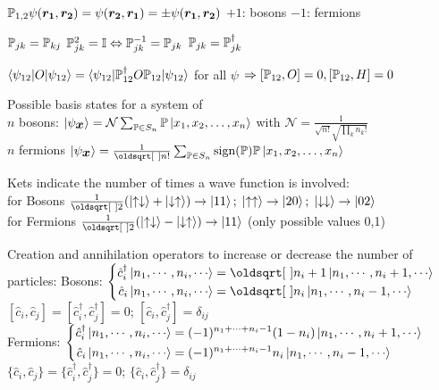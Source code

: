\begin{squishlist}
    \item $\P_{1,2} \psi(\vec{r_1}, \vec{r_2}) = \psi(\vec{r_2}, \vec{r_1}) = \pm \psi(\vec{r_1}, \vec{r_2})$ \quad $+1$: bosons \quad $-1$: fermions
    \item $\P_{jk} = \P_{kj}$ \squishsep $\P_{jk}^2 = \id \Leftrightarrow \P_{jk}^{-1}=\P_{jk}$ \squishsep $\P_{jk} = \P_{jk}^{\dagger}$
    \item $\braket{\psi_{12}|O|\psi_{12}} = \braket{\psi_{12}|\P_{12}^{\dagger}O\P_{12}|\psi_{12}}$ for all $\psi$ $\Rightarrow [\P_{12},O] = 0, [\P_{12},H] = 0$
    \item Possible basis states for a system of \\ $n$ bosons: $\ket{\psi_{\vec{x}}} = \mathcal{N} \sum_{\P \in S_n} \P\ket{x_1,x_2, \ldots, x_n}$ with $\mathcal{N} = \frac{1}{\sqrt{n!}\sqrt{\prod_k n_k !}}$ \\
    $n$ fermions $\ket{\psi_{\vec{x}}} = \frac{1}{\sqrt{n!}} \sum_{\P \in S_n} \text{sign}(\P) \P \ket{x_1, x_2, \ldots, x_n}$
\end{squishlist}

\begin{squishlist}
    \item Kets indicate the number of times a wave function is involved:\\
    for Bosons $\frac{1}{\sqrt{2}} ( \ket{\uparrow \downarrow} + \ket{\downarrow \uparrow}) \rightarrow \ket{11};\; \ket{\uparrow \uparrow} \rightarrow \ket{20};\; \ket{\downarrow \downarrow} \rightarrow \ket{02}$\\
    for Fermions $\frac{1}{\sqrt{2}} ( \ket{\uparrow \downarrow} - \ket{\downarrow \uparrow}) \rightarrow \ket{11}$ (only possible values 0,1)
    \item Creation and annihilation operators to increase or decrease the number of particles:
    Bosons:  $\left\{ \begin{aligned}
    \hat{c}_i^{\dagger} \ket{n_1, \cdots, n_i, \cdots} &= \sqrt{n_i + 1} \ket{n_1, \cdots, n_i +1, \cdots} \\
    \hat{c}_i \ket{n_1, \cdots, n_i, \cdots} &= \sqrt{n_i} \ket{n_1, \cdots, n_i -1, \cdots}
    \end{aligned}\right.$ \\
    $[\hat{c}_i, \hat{c}_j] = [\hat{c}_i^{\dagger}, \hat{c}_j^{\dagger}] = 0$; \qquad $[\hat{c}_i, \hat{c}_j^{\dagger}] = \delta_{ij}$ \\
    Fermions: $\left\{ \begin{aligned}
    \hat{c}_i^{\dagger} \ket{n_1, \cdots, n_i, \cdots} &= (-1)^{n_1+\cdots+n_i-1}(1-n_i) \ket{n_1, \cdots, n_i +1, \cdots} \\
    \hat{c}_i \ket{n_1, \cdots, n_i, \cdots} &= (-1)^{n_1+\cdots+n_i-1} n_i \ket{n_1, \cdots, n_i -1, \cdots}
    \end{aligned}\right.$ \\
    $\{\hat{c}_i, \hat{c}_j\} = \{\hat{c}_i^{\dagger}, \hat{c}_j^{\dagger}\} = 0$; \qquad $\{\hat{c}_i, \hat{c}_j^{\dagger}\} = \delta_{ij}$ 
\end{squishlist}

